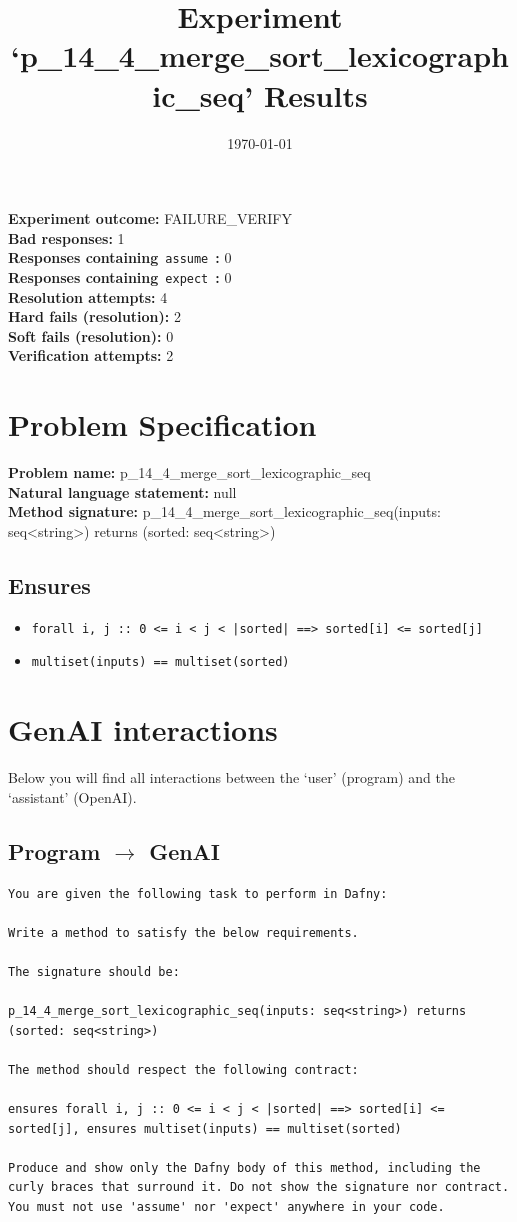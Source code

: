\documentclass{article}
\begin{document}
\title{Experiment `p\_14\_4\_merge\_sort\_lexicographic\_seq' Results}
\author{\today}
\date{}
\maketitle
\textbf{Experiment outcome: }FAILURE\_VERIFY
\\\textbf{Bad responses: }1
\\\textbf{Responses containing}~\texttt{assume}~\textbf{: }0
\\\textbf{Responses containing}~\texttt{expect}~\textbf{: }0
\\\textbf{Resolution attempts: }4
\\\textbf{Hard fails (resolution): }2
\\\textbf{Soft fails (resolution): }0
\\\textbf{Verification attempts: }2
\section*{Problem Specification}
\textbf{Problem name: }p\_14\_4\_merge\_sort\_lexicographic\_seq
\\\textbf{Natural language statement: }null
\\\textbf{Method signature: }p\_14\_4\_merge\_sort\_lexicographic\_seq(inputs: seq<string>) returns (sorted: seq<string>)
\subsection*{Ensures}
\begin{itemize}
\item \texttt{forall i, j :: 0 <= i < j < |sorted| ==> sorted[i] <= sorted[j]}
\item \texttt{multiset(inputs) == multiset(sorted)}
\end{itemize}
\clearpage
\section*{GenAI interactions}
Below you will find all interactions between the `user' (program) and the `assistant' (OpenAI).
\subsection*{Program $\rightarrow$ GenAI}
\begin{lstlisting}
You are given the following task to perform in Dafny:

Write a method to satisfy the below requirements.

The signature should be:

p_14_4_merge_sort_lexicographic_seq(inputs: seq<string>) returns (sorted: seq<string>)

The method should respect the following contract:

ensures forall i, j :: 0 <= i < j < |sorted| ==> sorted[i] <= sorted[j], ensures multiset(inputs) == multiset(sorted)

Produce and show only the Dafny body of this method, including the curly braces that surround it. Do not show the signature nor contract. You must not use 'assume' nor 'expect' anywhere in your code.
\end{lstlisting}
\end{document}
